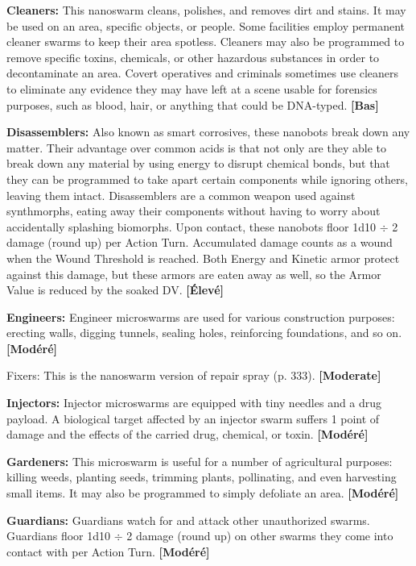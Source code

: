 {{\textbf{Cleaners:} This nanoswarm cleans, polishes, and removes dirt and stains. It may be used on an area, specific objects, or people. Some facilities employ permanent cleaner swarms to keep their area spotless. Cleaners may also be programmed to remove specific toxins, chemicals, or other hazardous substances in order to decontaminate an area. Covert operatives and criminals sometimes use cleaners to eliminate any evidence they may have left at a scene usable for forensics purposes, such as blood, hair, or anything that could be DNA-typed. \textbf{[Bas]} 

\textbf{Disassemblers:} Also known as smart corrosives, these nanobots break down any matter. Their advantage over common acids is that not only are they able to break down any material by using energy to disrupt chemical bonds, but that they can be programmed to take apart certain components while ignoring others, leaving them intact. Disassemblers are a common weapon used against synthmorphs, eating away their components without having to worry about accidentally splashing biomorphs. Upon contact, these nanobots floor 1d10 $\div$ 2 damage (round up) per Action Turn. Accumulated damage counts as a wound when the Wound Threshold is reached. Both Energy and Kinetic armor protect against this damage, but these armors are eaten away as well, so the Armor Value is reduced by the soaked DV. \textbf{[Élevé]} 

\textbf{Engineers:} Engineer microswarms are used for various construction purposes: erecting walls, digging tunnels, sealing holes, reinforcing foundations, and so on. \textbf{[Modéré]} 

Fixers: This is the nanoswarm version of repair spray (p. 333). \textbf{[Moderate]} 

\textbf{Injectors:} Injector microswarms are equipped with tiny needles and a drug payload. A biological target affected by an injector swarm suffers 1 point of damage and the effects of the carried drug, chemical, or toxin. \textbf{[Modéré]} 

\textbf{Gardeners:} This microswarm is useful for a number of agricultural purposes: killing weeds, planting seeds, trimming plants, pollinating, and even harvesting small items. It may also be programmed to simply defoliate an area. \textbf{[Modéré]} 

\textbf{Guardians:} Guardians watch for and attack other unauthorized swarms. Guardians floor 1d10 $\div$ 2 damage (round up) on other swarms they come into contact with per Action Turn. \textbf{[Modéré]} 

}}
